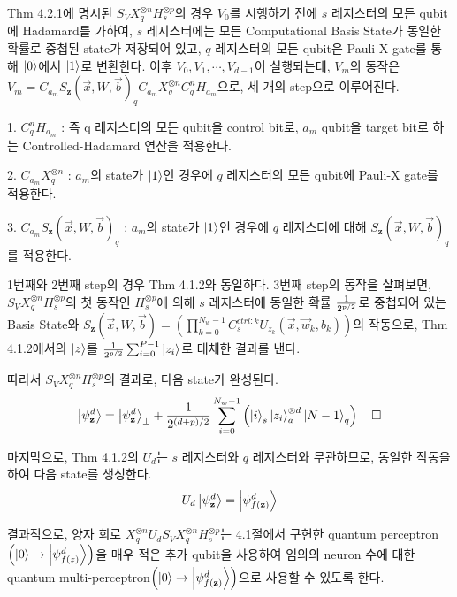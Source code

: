 \begin{pf}

Thm 4.2.1에 명시된 \(S_V X_q^{\otimes n} H_s^{\otimes p}\)의 경우 $V_0$를 시행하기 전에 \(s\) 레지스터의 모든 qubit에 Hadamard를 가하여, \(s\) 레지스터에는 모든 Computational Basis State가 동일한 확률로 중첩된 state가 저장되어 있고, \(q\) 레지스터의 모든 qubit은 Pauli-X gate를 통해 \(\ket 0\)에서 \(\ket 1\)로 변환한다. 이후 \(V_0, V_1, \cdots, V_{d-1}\)이 실행되는데, $V_m$의 동작은 \(V_m = C_{a_m}S_{\mathbf{z}}(\vec{x}, W, \vec{b})_q C_{a_m}X^{\otimes n}_q C_q^nH_{a_m}\)으로, 세 개의 step으로 이루어진다.

1. \(C_q^nH_{a_m}\) : 즉 q 레지스터의 모든 qubit을 control bit로, \(a_m\) qubit을 target bit로 하는 Controlled-Hadamard 연산을 적용한다.

2. \(C_{a_m}X^{\otimes n}_q\) : \(a_m\)의 state가 \(\ket 1\)인 경우에 \(q\) 레지스터의 모든 qubit에 Pauli-X gate를 적용한다.

3. \(C_{a_m}S_{\mathbf{z}}(\vec{x}, W, \vec{b})_q\) : \(a_m\)의 state가 \(\ket 1\)인 경우에 \(q\) 레지스터에 대해 \(S_{\mathbf{z}}(\vec{x}, W, \vec{b})_q\)를 적용한다.

1번째와 2번째 step의 경우 Thm 4.1.2와 동일하다. 3번째 step의 동작을 살펴보면, \(S_V X_q^{\otimes n} H_s^{\otimes p}\)의 첫 동작인 \(H_s^{\otimes p}\)에 의해 \(s\) 레지스터에 동일한 확률 \(1 \over {2^{p/2}}\)로 중첩되어 있는 Basis State와 \(S_{\mathbf z}(\vec{x}, W, \vec{b})= \left(\prod_{k=0}^{N_w-1}C_{s}^{ctrl : k}U_{z_k}(\vec{x}, \vec{w}_k, b_k)\right)\)의 작동으로, Thm 4.1.2에서의 \(\ket{z}\)를 \({1\over {2^{p/2}}}\sum_{i=0}^{P-1} \ket{z_i}\)로 대체한 결과를 낸다.

따라서 \(S_V X_q^{\otimes n} H_s^{\otimes p}\)의 결과로, 다음 state가 완성된다.
\[
    \ket{\psi_{\mathbf z}^d} = \ket{\psi_{\mathbf z}^d}_{\perp} + {1 \over {2^{(d + p) / 2}}}\sum_{i=0}^{N_w - 1}\left( \ket{i}_{s} \ket{z_i}_{a}^{\otimes d} \ket{N-1}_q \right) \quad \square
\]
\end{pf}

마지막으로, Thm 4.1.2의 $U_d$는 \(s\) 레지스터와 \(q\) 레지스터와 무관하므로, 동일한 작동을 하여 다음 state를 생성한다.
\[
    U_d \ket{\psi_{\mathbf z}^d} = \ket{\psi_{f(\mathbf z)}^d}
\]

결과적으로, 양자 회로 \(X_q^{\otimes n} U_d S_V X_q^{\otimes n} H_s^{\otimes p}\)는 4.1절에서 구현한 quantum perceptron\(\left(\ket{0} \rightarrow \ket{\psi_{ f(z)}^d}\right)\)을 매우 적은 추가 qubit을 사용하여 임의의 neuron 수에 대한 quantum multi-perceptron\(\left(\ket{0} \rightarrow \ket{\psi_{f(\mathbf z)}^d}\right)\)으로 사용할 수 있도록 한다.


